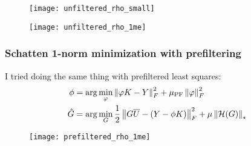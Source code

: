 \begin{frame}
\begin{figure}
\texttt{[image: unfiltered\_rho\_small]}
\end{figure}
\end{frame}

\begin{frame}
\begin{figure}
\texttt{[image: unfiltered\_rho\_1me]}
\end{figure}
\end{frame}

\begin{frame}
\frametitle{Schatten 1-norm minimization with prefiltering}
I tried doing the same thing with prefiltered least squares:
\begin{align*}
\phi &= \arg\min_\varphi \left\Vert{\varphi K - Y}\right\Vert_F^2 + \mu_{\text{PF}} \left\Vert{\varphi}\right\Vert_F^2 \\
\hat G &= \arg\min_G \frac{1}{2} \left\Vert{G \overline{U} - (Y - \phi K)}\right\Vert_F^2 + \mu \left\Vert{\mathcal{H}(G)}\right\Vert_\star
\end{align*}
\end{frame}

\begin{frame}
\begin{figure}
\texttt{[image: prefiltered\_rho\_1me]}
\end{figure}
\end{frame}
